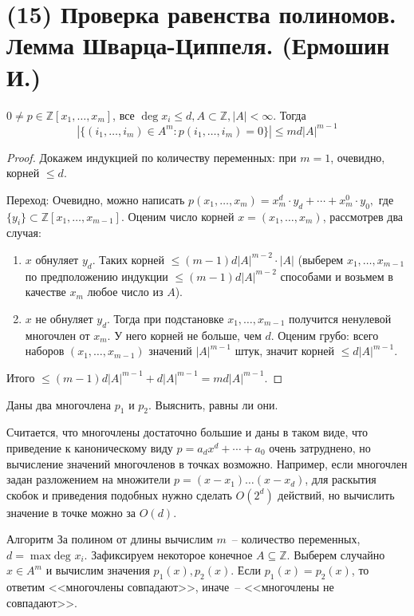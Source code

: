 \section{(15) Проверка равенства полиномов. Лемма Шварца-Циппеля. (Ермошин И.)}

\begin{lemma*}
	$0\ne p\in\mathbb{Z}[x_1,\ldots,x_m]$, все $\deg x_i\le d, A\subset\mathbb{Z}, |A|<\infty$. Тогда $$\left|\{(i_1,\ldots,i_m)\in A^m\colon p(i_1,\ldots,i_m)=0\}\right|\le md|A|^{m-1}$$
\end{lemma*}
\begin{proof}
Докажем индукцией по количеству переменных: при $m=1$, очевидно, корней $\le d$.

Переход:
Очевидно, можно написать $p(x_1,\ldots,x_m)=x_m^d\cdot y_d+\cdots+x_m^0\cdot y_0,$ где $\{y_i\}\subset \mathbb Z[x_1,\ldots,x_{m-1}]$. Оценим число корней $x = (x_1, \ldots, x_m)$, рассмотрев два случая:
\begin{enumerate}
\item $x$ обнуляет $y_d$. Таких корней $\le (m-1)d|A|^{m-2} \cdot |A|$ (выберем $x_1,\ldots,x_{m-1}$ по предположению индукции $\le(m-1)d|A|^{m-2}$ способами и возьмем в качестве $x_m$ любое число из $A$).
\item $x$ не обнуляет $y_d$. Тогда при подстановке $x_1, \ldots, x_{m-1}$ получится ненулевой многочлен от $x_m$. У него корней не больше, чем $d$. Оценим грубо: всего наборов $(x_1, \ldots, x_{m-1})$ значений $|A|^{m-1}$ штук, значит корней $\le d|A|^{m-1}$.
\end{enumerate}

Итого $\le (m-1)d|A|^{m-1}+d|A|^{m-1}=md|A|^{m-1}.$
\end{proof}

\begin{problem*}
	Даны два многочлена $p_1$ и $p_2$. Выяснить, равны ли они.
\end{problem*}

Считается, что многочлены достаточно большие и даны в таком виде, что приведение к каноническому виду $p = a_d x^d + \cdots + a_0$ очень затруднено, но вычисление значений многочленов в точках возможно. Например, если многочлен задан разложением на множители $p = (x-x_1)\ldots(x-x_d)$, для раскытия скобок и приведения подобных нужно сделать $O(2^d)$ действий, но вычислить значение в точке можно за $O(d)$.

\begin{algodescription}{Алгоритм} За полином от длины вычислим $m$~-- количество переменных, $d = \max\text{deg } x_i$. Зафиксируем некоторое конечное $A \subseteq \mathbb Z$. Выберем случайно $x \in A^m$ и вычислим значения $p_1(x), p_2(x)$. Если $p_1(x) = p_2(x)$, то ответим <<многочлены совпадают>>, иначе~-- <<многочлены не совпадают>>. 
\end{algodescription}

